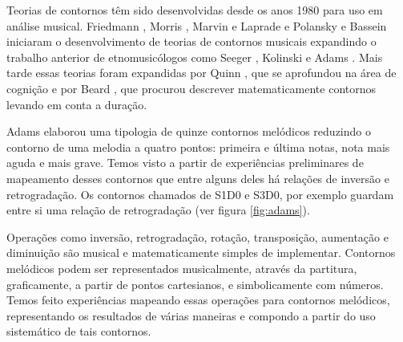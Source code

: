 \documentclass{article}
\begin{document}
Teorias de contornos têm sido desenvolvidas desde os anos 1980 para
uso em análise musical. Friedmann
\cite{friedmann85:_method_discus_contour,friedmann1987rmc}, Morris
\cite{morris1987cpc}, Marvin e Laprade
\cite{marvin87:_relat_music_contour} e Polansky e Bassein
\cite{polansky92:_possib_impos_melod} iniciaram o desenvolvimento de
teorias de contornos musicais expandindo o trabalho anterior de
etnomusicólogos como Seeger \cite{seeger1960mml}, Kolinski
\cite{kolinkski65:_struc_melod_movem} e Adams
\cite{adams1976mct}. Mais tarde essas teorias foram expandidas por
Quinn \cite{quinn97:_fuzzy_exten_theor_contour}, que se aprofundou na
área de cognição e por Beard \cite{beard2003cmm}, que procurou
descrever matematicamente contornos levando em conta a duração.


Adams \cite{adams1976mct} elaborou uma tipologia de quinze contornos
melódicos reduzindo o contorno de uma melodia a quatro pontos:
primeira e última notas, nota mais aguda e mais grave. Temos visto a
partir de experiências preliminares de mapeamento desses contornos que
entre alguns deles há relações de inversão e retrogradação. Os
contornos chamados de S1D0 e S3D0, por exemplo guardam entre si uma
relação de retrogradação (ver figura \ref{fig:adams}).

Operações como inversão, retrogradação, rotação, transposição,
aumentação e diminuição são musical e matematicamente simples de
implementar. Contornos melódicos podem ser representados musicalmente,
através da partitura, graficamente, a partir de pontos cartesianos, e
simbolicamente com números. Temos feito experiências mapeando essas
operações para contornos melódicos, representando os resultados de
várias maneiras e compondo a partir do uso sistemático de tais
contornos.
\end{document}
